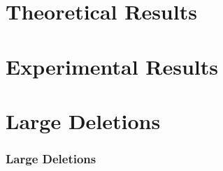 \documentclass{beamer}
\begin{document}
\section{Theoretical Results}

\section{Experimental Results}




\appendix
\section{Large Deletions}
\begin{frame}
  \frametitle{Large Deletions}


\end{frame}
\end{document}
